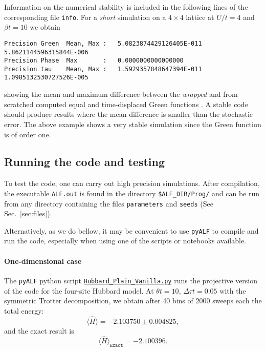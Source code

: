Information on the numerical stability is included in the following lines of the corresponding file \texttt{info}. 
For a  \textit{short} simulation on a $4 \times 4$  lattice at $U/t=4$ and $\beta t = 10$  we obtain
\begin{lstlisting}[basicstyle=\ttfamily\small,columns=fullflexible,keepspaces=true]
Precision Green  Mean, Max :   5.0823874429126405E-011  5.8621144596315844E-006
Precision Phase  Max       :   0.0000000000000000    
Precision tau    Mean, Max :   1.5929357848647394E-011  1.0985132530727526E-005 
\end{lstlisting}
showing the mean and maximum difference between the \textit{wrapped}  and from scratched computed equal and time-displaced  Green functions \cite{Assaad08_rev}.
A stable code  should produce results where the mean difference is smaller than the  stochastic error. The above example  shows a very stable simulation since the Green function  is of order one. 

\subsection{Running the code and testing}

To test the code, one can carry out high precision simulations. After compilation, the executable \texttt{ALF.out} is found in the directory \texttt{\$ALF\_DIR/Prog/} and can be run from any directory containing the files \texttt{parameters} and \texttt{seeds} (See Sec.~\ref{sec:files}).

Alternatively, as we do bellow, it may be convenient to use \texttt{pyALF} to compile and run the code, especially when using one of the scripts or notebooks available.  

\paragraph*{One-dimensional case} 

The \texttt{pyALF} python script   \href{https://git.physik.uni-wuerzburg.de/ALF/pyALF/-/blob/\pyALFbranch/Scripts/Hubbard_Plain_Vanilla.py}{\texttt{Hubbard\_Plain\_Vanilla.py}}   runs the projective version of the code for the four-site Hubbard model.  At $\theta t =10$, $\Delta \tau t = 0.05 $ with the symmetric Trotter  decomposition, we obtain after 40 bins of 2000 sweeps each the total energy:   
\begin{equation*}
       \langle  \hat{H}   \rangle = -2.103750  \pm      0.004825,
 \end{equation*}
and the exact result is  
\begin{equation*}
\langle  \hat{H}   \rangle_{\texttt{Exact}}    = -2.100396.
\end{equation*}

